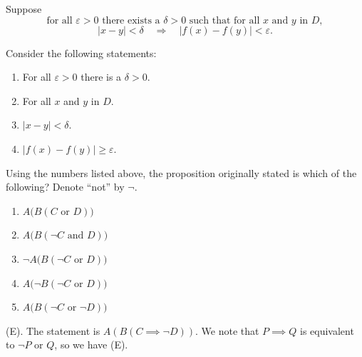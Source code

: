 \begin{exercise}
Suppose
\[
\text{for all }\varepsilon>0\text{ there exists a }\delta>0
\text{ such that for all }x\text{ and }y\text{ in }D,
\]
\[
|x-y|<\delta
\quad\Longrightarrow\quad
|f(x)-f(y)|<\varepsilon.
\]

Consider the following statements:

\begin{enumerate}
    \item For all $\varepsilon>0$ there is a $\delta>0$.
    \item For all $x$ and $y$ in $D$.
    \item $|x-y|<\delta$.
    \item $|f(x)-f(y)|\geq\varepsilon$.
\end{enumerate}
Using the numbers listed above, the proposition originally stated is which of the following?
Denote ``not'' by $\neg$.
\begin{enumerate}[label=(\Alph*)]
    \item $A\bigl(B(C\text{ or }D)\bigr)$
    \item $A\bigl(B(\neg C\text{ and }D)\bigr)$
    \item $\neg A\bigl(B(\neg C\text{ or }D)\bigr)$
    \item $A\bigl(\neg B(\neg C\text{ or }D)\bigr)$
    \item $A\bigl(B(\neg C\text{ or }\neg D)\bigr)$
\end{enumerate}
\end{exercise}
\begin{solution}
(E). The statement is $A(B(C \implies \neg D))$. We note that $P \implies Q$ is equivalent 
to $\neg P \text{ or } Q$, so we have (E).
\end{solution}


